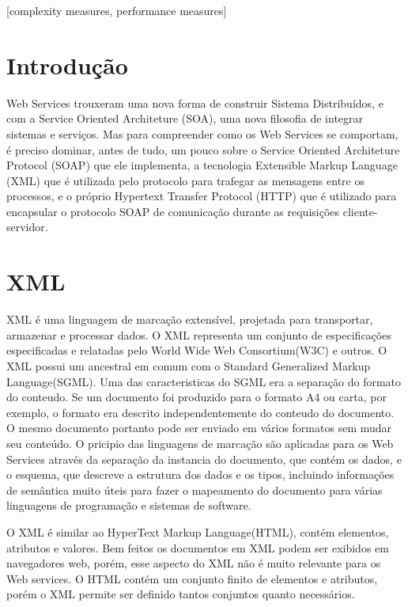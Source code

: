 \documentclass{acm_proc_article-sp}
\begin{document}
[complexity measures, performance measures]



\section{Introdução}
		Web Services trouxeram uma nova forma de construir Sistema Distribuídos, e com a Service Oriented Architeture (SOA), uma nova filosofia de integrar sistemas e serviços. Mas para compreender como os Web Services se comportam, é preciso dominar, antes de tudo, um pouco sobre o Service Oriented Architeture Protocol (SOAP) que ele implementa, a tecnologia Extensible Markup Language (XML) que é utilizada pelo protocolo para trafegar as mensagens entre os processos, e o próprio Hypertext Transfer Protocol (HTTP) que é utilizado para encapsular o protocolo SOAP de comunicação durante as requisições cliente-servidor.
		
		
\section{XML}
		XML é uma linguagem de marcação extensível, projetada para transportar, armazenar e processar dados. O XML representa um conjunto de especificações especificadas e relatadas pelo World Wide Web Consortium(W3C) e outros. O XML possui um ancestral em comum com o Standard Generalized Markup Language(SGML). Uma das caracteristicas do SGML era a separação do formato do conteudo. Se um documento foi produzido para o formato A4 ou carta, por exemplo, o formato era descrito independentemente do conteudo do documento. O mesmo documento portanto pode ser enviado em vários formatos sem mudar seu conteúdo. O pricipio das linguagens de marcação são aplicadas para os Web Services através da separação da instancia do documento, que contém os dados, e o esquema, que descreve a estrutura dos dados e os tipos, incluindo informações de semântica muito úteis para fazer o mapeamento do documento para várias linguagens de programação e sistemas de software.
		
		O XML é similar ao HyperText Markup Language(HTML), contém elementos, atributos e valores. Bem feitos os documentos em XML podem ser exibidos em navegadores web, porém, esse aspecto do XML não é muito relevante para os Web services. O HTML contém um conjunto finito de elementos e atributos, porém o XML permite ser definido tantos conjuntos quanto necessários.
		
\end{document}
